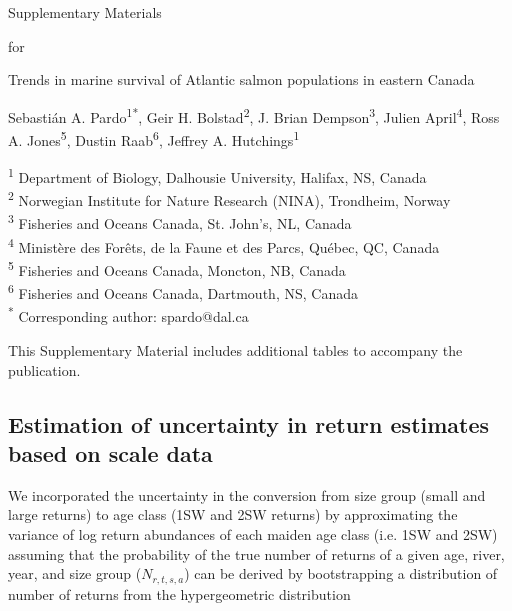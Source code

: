 \documentclass[12pt]{article}
\newcommand{\beginsupplement}{%
        \setcounter{table}{0}
        \renewcommand{\thetable}{S\arabic{table}}%
        \setcounter{figure}{0}
        \renewcommand{\thefigure}{S\arabic{figure}}%
     }
\begin{document}
\linenumbers


\noindent
{\Large Supplementary Materials}
\newline

\noindent
{\Large for}
\newline

\noindent
{\large Trends in marine survival of Atlantic salmon populations in eastern Canada}
\newline

\noindent
Sebasti\'{a}n A. Pardo\textsuperscript{1*}, Geir H. Bolstad\textsuperscript{2}, J. Brian Dempson\textsuperscript{3}, 
        Julien April\textsuperscript{4}, Ross A. Jones\textsuperscript{5}, %
        Dustin Raab\textsuperscript{6}, Jeffrey A. Hutchings\textsuperscript{1}
\newline

\noindent
\small{\textsuperscript{1} Department of Biology, Dalhousie University, Halifax, NS, Canada\\}
\small{\textsuperscript{2} Norwegian Institute for Nature Research (NINA), Trondheim, Norway\\}
\small{\textsuperscript{3} Fisheries and Oceans Canada, St. John's, NL, Canada\\}
\small{\textsuperscript{4} Minist\`{e}re des For\^{e}ts, de la Faune et des Parcs, Qu\'{e}bec, QC, Canada\\}
\small{\textsuperscript{5} Fisheries and Oceans Canada, Moncton, NB, Canada\\}
\small{\textsuperscript{6} Fisheries and Oceans Canada, Dartmouth, NS, Canada\\}
\small{\textsuperscript{*} Corresponding author: spardo@dal.ca}
\beginsupplement

This Supplementary Material includes additional tables to accompany the publication. 

\clearpage

\subsection*{Estimation of uncertainty in return estimates based on scale data}

We incorporated the uncertainty in the conversion from size group (small and large returns) to age class (1SW and 2SW returns) by 
approximating the variance of log return abundances of each maiden age class (i.e. 1SW and 2SW) assuming that the probability 
of the true number of returns of a given age, river, year, and size group ($N_{r,t,s,a}$) can be derived by bootstrapping a distribution
of number of returns from the hypergeometric distribution
\end{document}
